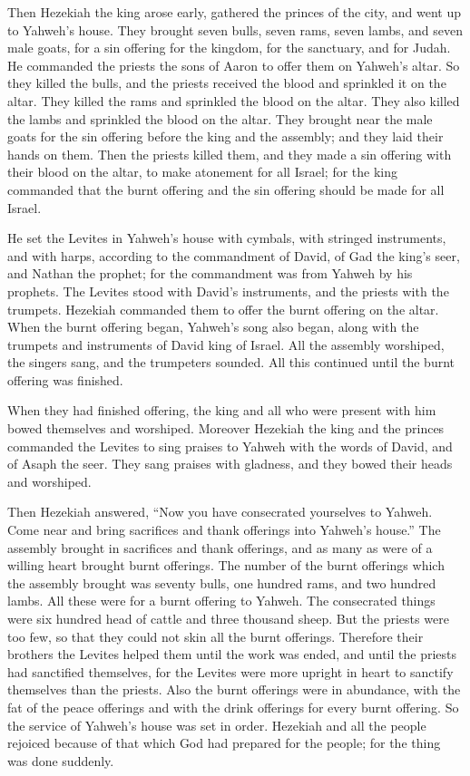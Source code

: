  Then Hezekiah the king arose early, gathered the princes
of the city, and went up to Yahweh's house.  They brought
seven bulls, seven rams, seven lambs, and seven male goats, for a sin
offering for the kingdom, for the sanctuary, and for Judah. He commanded
the priests the sons of Aaron to offer them on Yahweh's altar.
 So they killed the bulls, and the priests received the
blood and sprinkled it on the altar. They killed the rams and sprinkled
the blood on the altar. They also killed the lambs and sprinkled the
blood on the altar.  They brought near the male goats for
the sin offering before the king and the assembly; and they laid their
hands on them.  Then the priests killed them, and they made
a sin offering with their blood on the altar, to make atonement for all
Israel; for the king commanded that the burnt offering and the sin
offering should be made for all Israel.

 He set the Levites in Yahweh's house with cymbals, with
stringed instruments, and with harps, according to the commandment of
David, of Gad the king's seer, and Nathan the prophet; for the
commandment was from Yahweh by his prophets.  The Levites
stood with David's instruments, and the priests with the trumpets.
 Hezekiah commanded them to offer the burnt offering on the
altar. When the burnt offering began, Yahweh's song also began, along
with the trumpets and instruments of David king of Israel. 
All the assembly worshiped, the singers sang, and the trumpeters
sounded. All this continued until the burnt offering was finished.

 When they had finished offering, the king and all who were
present with him bowed themselves and worshiped.  Moreover
Hezekiah the king and the princes commanded the Levites to sing praises
to Yahweh with the words of David, and of Asaph the seer. They sang
praises with gladness, and they bowed their heads and worshiped.

 Then Hezekiah answered, ``Now you have consecrated
yourselves to Yahweh. Come near and bring sacrifices and thank offerings
into Yahweh's house.'' The assembly brought in sacrifices and thank
offerings, and as many as were of a willing heart brought burnt
offerings.  The number of the burnt offerings which the
assembly brought was seventy bulls, one hundred rams, and two hundred
lambs. All these were for a burnt offering to Yahweh.  The
consecrated things were six hundred head of cattle and three thousand
sheep.  But the priests were too few, so that they could
not skin all the burnt offerings. Therefore their brothers the Levites
helped them until the work was ended, and until the priests had
sanctified themselves, for the Levites were more upright in heart to
sanctify themselves than the priests.  Also the burnt
offerings were in abundance, with the fat of the peace offerings and
with the drink offerings for every burnt offering. So the service of
Yahweh's house was set in order.  Hezekiah and all the
people rejoiced because of that which God had prepared for the people;
for the thing was done suddenly.

